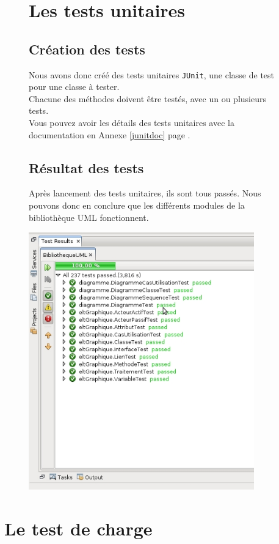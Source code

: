\documentclass[12pt,a4paper,openany]{report}
\begin{document}
			\begin{figure}[H]
				\section{Les tests unitaires}
				\subsection{Création des tests}
				\begin{flushleft}
					Nous avons donc créé des tests unitaires \texttt{JUnit}, une classe de test pour une classe à tester.\\ Chacune des méthodes doivent être testés, 
					avec un ou plusieurs tests.\\
					Vous pouvez avoir les détails des tests unitaires avec la documentation en Annexe \ref{junitdoc} page \pageref{junitdoc}.
				\subsection{Résultat des tests}
				Après lancement des tests unitaires, ils sont tous passés. Nous pouvons donc en conclure que les différents modules de la bibliothèque UML fonctionnent. 
				\end{flushleft}
				\centering
				\includegraphics[width=9.75cm]{junitPassed.jpg} 
			\end{figure}
			\newpage
	\section{Le test de charge}
\end{document}
